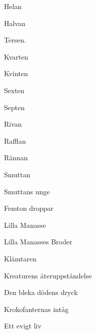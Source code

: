 \vspace{8pt}
\begin{enumerate}[leftmargin=0.65cm,topsep=0pt,itemsep=2pt,partopsep=0pt,parsep=3pt]
  \begin{minipage}{0.43\linewidth} 
  \item Helan
  \item Halvan
  \item Tersen.
  \item Kvarten
  \item Kvinten
  \item Sexten
  \item Septen
  \item Rivan
  \item Rafflan
  \item Rännan
  \end{minipage}
  \begin{minipage}{0.55\linewidth}
  \item Smuttan
  \item Smuttans unge
  \item Femton droppar
  \item Lilla Manasse
  \item Lilla Manasses Broder
  \item Klämtaren
  \item Kreaturens återuppståndelse
  \item Den bleka dödens dryck
  \item Krokofanternas intåg
  \item Ett evigt liv
  \end{minipage}
\end{enumerate}\par
